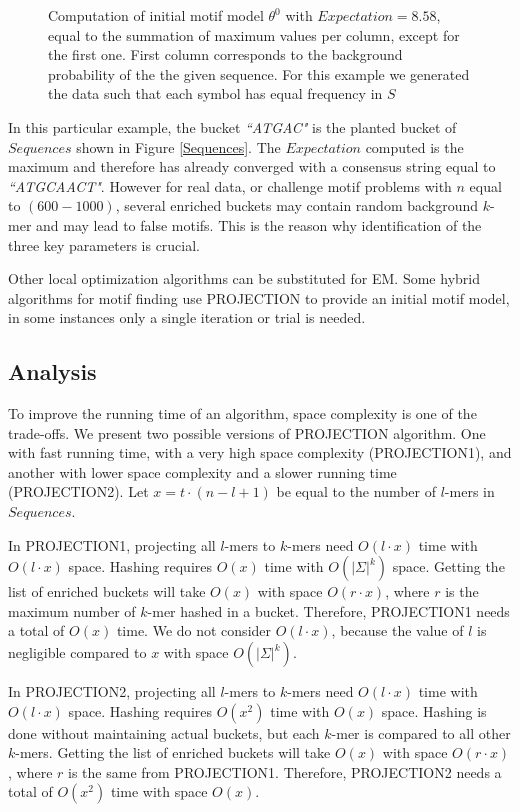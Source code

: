 \documentclass{llncs}
\begin{document}
{\begin{example}
\begin{figure}[h]
\begin{center}
\begin{small}
\begin{tabular}{l l l c c c c c c c c}
\end{tabular}
\end{small}
\caption{Computation of initial motif model $\theta^0$ with $Expectation = 8.58 $, equal to the summation of maximum values per column, except for the first one. First column corresponds to the background probability of the the given sequence. For this example we generated the data such that each symbol has equal frequency in $S$}
\label{profile}
\end{center}
\end{figure}
In this particular example, the bucket \textit{``ATGAC"} is the planted bucket of  $Sequences$ shown in Figure \ref{Sequences}. The $Expectation$ computed is the maximum and therefore has already converged with a consensus string equal  to \textit{``ATGCAACT"}. However for real data, or challenge motif problems with $n$ equal to $(600-1000)$, several enriched buckets may contain random background $k$-mer and may lead to false motifs. This is the reason why identification of the three key parameters is crucial.
\end{example}
Other local optimization algorithms can be substituted for EM. Some hybrid algorithms  for motif finding use PROJECTION to provide an initial motif model, in some instances only a single iteration or trial is needed. 

\subsection{Analysis}
To improve the running time of an algorithm, space complexity is one of the trade-offs. We present two possible versions of PROJECTION algorithm. One with fast running time, with a very high space complexity (PROJECTION1), and another with lower space complexity and a slower running time (PROJECTION2). Let $x = t \cdot (n-l+1)$ be equal to the number of $l$-mers in $Sequences$.

In PROJECTION1, projecting all $l$-mers to $k$-mers need $O(l \cdot x)$ time with $O(l \cdot x)$ space. Hashing requires $O(x)$ time with $O(|\Sigma|^k)$ space. Getting the list of enriched buckets will take $O(x)$ with space $O(r \cdot x)$, where $r$ is the maximum number of $k$-mer hashed in a bucket.  Therefore, PROJECTION1 needs a total of $O(x)$ time. We do not consider $O(l \cdot x)$, because the value of $l$ is negligible compared to $x$ with space $O(|\Sigma|^k)$.

In PROJECTION2, projecting all $l$-mers to  $k$-mers need $O(l \cdot x)$ time with $O(l \cdot x)$ space. Hashing requires $O(x^2)$ time with $O(x)$ space. {Hashing is done without maintaining actual buckets, but each $k$-mer is compared to all other $k$-mers}. Getting the list of enriched buckets will take $O(x)$ with space $O(r \cdot x)$, where $r$ is the same from PROJECTION1.  Therefore, PROJECTION2 needs a total of $O(x^2)$ time with space $O(x)$.

}
\end{document}
